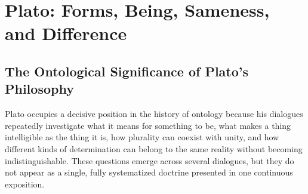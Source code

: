 %
%
%

\section{Plato: Forms, Being, Sameness, and Difference}
\label{sec:chapter-08-plato}

\subsection{The Ontological Significance of Plato's Philosophy}

Plato occupies a decisive position in the history of ontology because his
dialogues repeatedly investigate what it means for something to be, what
makes a thing intelligible as the thing it is, how plurality can coexist
with unity, and how different kinds of determination can belong to the
same reality without becoming indistinguishable. These questions emerge
across several dialogues, but they do not appear as a single, fully
systematized doctrine presented in one continuous exposition.

